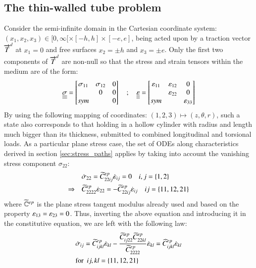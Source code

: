 \subsection{The thin-walled tube problem}
\label{sec:num_thin-walled}
Consider the semi-infinite domain in the Cartesian coordinate system: $(x_1, x_2, x_3) \in [0,\infty[ \times [-h,h] \times [-e,e]$, being acted upon by a traction vector ${\overrightarrow{T}}^d$ at $x_1=0 $ and free surfaces $x_2=\pm h$ and $x_3=\pm e$.
Only the first two components of ${\overrightarrow{T}}^d$ are non-null so that the stress and strain tensors within the medium are of the form:
\begin{equation}
  {\underline{\underline{\sigma}}} = \left[\begin{matrix}\sigma_{11} & \sigma_{12} & 0\\  & 0 & 0\\sym & & 0\end{matrix}\right] \quad ;\quad{\underline{\underline{\varepsilon}}} = \left[\begin{matrix}\varepsilon_{11} & \varepsilon_{12} &0 \\  & \varepsilon_{22}&0 \\sym & & \varepsilon_{33}\end{matrix}\right]
\end{equation}
By using the following mapping of coordinates: $(1,2,3) \mapsto (z,\theta,r)$, such a state also corresponds to that 
holding in a hollow cylinder with radius and length much bigger than its thickness, submitted to combined longitudinal and torsional loads.
As a particular plane stress case, the set of ODEs along characteristics derived in section \ref{sec:stress_paths} applies by taking into account the vanishing stress component $\sigma_{22}$:
\begin{align*}
  & \dot{\sigma}_{22}=\widetilde{C}^{ep}_{22ij} \dot{\varepsilon}_{ij} =0 \quad i,j=\{1,2\} \\
  \Rightarrow  \quad  &\widetilde{C}^{ep}_{2222} \dot{\varepsilon}_{22} = - \widetilde{C}^{ep}_{22ij}\dot{\varepsilon}_{ij} \quad ij=\{11,12,21\}
\end{align*}
where $\widetilde{\mathbb{C}}^{ep}$ is the plane stress tangent modulus already used and based on the property $\varepsilon_{13}=\varepsilon_{23}=0$.
Thus, inverting the above equation and introducing it in the constitutive equation, we are left with the following law:
\begin{equation}
  \label{eq:TW_tangent}
  \begin{aligned}
    & \dot{\sigma}_{ij}=\widetilde{C}^{ep}_{ijkl} \dot{\varepsilon}_{kl} - \frac{\widetilde{C}^{ep}_{ij22}\widetilde{C}^{ep}_{22kl}}{\widetilde{C}^{ep}_{2222}}\dot{\varepsilon}_{kl}= \widehat{C}^{ep}_{ijkl} \dot{\varepsilon}_{kl}\\
    & \text{for }\:ij,kl=\{11,12,21\}
  \end{aligned}
\end{equation}

